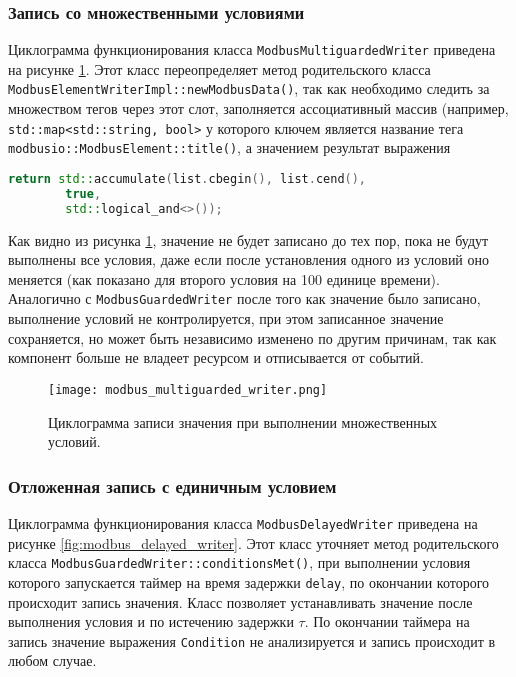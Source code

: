\subsubsection{Запись со множественными условиями}
Циклограмма функционирования класса \texttt{ModbusMultiguardedWriter} приведена на рисунке \ref{fig:modbus_multiguarded_writed}.
Этот класс переопределяет метод родительского класса \texttt{ModbusElementWriterImpl::newModbusData()},
так как необходимо следить за множеством тегов через этот слот,
заполняется ассоциативный массив (например, \texttt{std::map<std::string, bool>} у которого ключем является
название тега \texttt{modbusio::ModbusElement::title()}, а значением результат выражения
\begin{lstlisting}[language=C++]
    return std::accumulate(list.cbegin(), list.cend(),
        true,
        std::logical_and<>());
\end{lstlisting}
Как видно из рисунка \ref{fig:modbus_multiguarded_writed}, значение не будет записано до тех пор, пока не будут
выполнены все условия, даже если после установления одного из условий оно меняется
(как показано для второго условия на 100 единице времени). Аналогично с \texttt{ModbusGuardedWriter}
после того как значение было записано, выполнение условий не контролируется, 
при этом записанное значение сохраняется, но может быть независимо изменено по другим причинам,
так как компонент больше не владеет ресурсом и отписывается от событий.
\begin{figure}[h!]\begin{center}
    \texttt{[image: modbus\_multiguarded\_writer.png]}
    \caption{Циклограмма записи значения при выполнении множественных условий.}
        \label{fig:modbus_multiguarded_writed}
\end{center}\end{figure}



\subsubsection{Отложенная запись с единичным условием}
Циклограмма функционирования класса \texttt{ModbusDelayedWriter} приведена на рисунке \ref{fig:modbus_delayed_writer}.
Этот класс уточняет метод родительского класса \texttt{ModbusGuardedWriter::conditionsMet()},
при выполнении условия которого запускается таймер на время задержки \texttt{delay},
по окончании которого происходит запись значения.
Класс позволяет устанавливать значение после выполнения условия и по истечению задержки $\tau$.
По окончании таймера на запись значение выражения \texttt{Condition} не анализируется
и запись происходит в любом случае.


